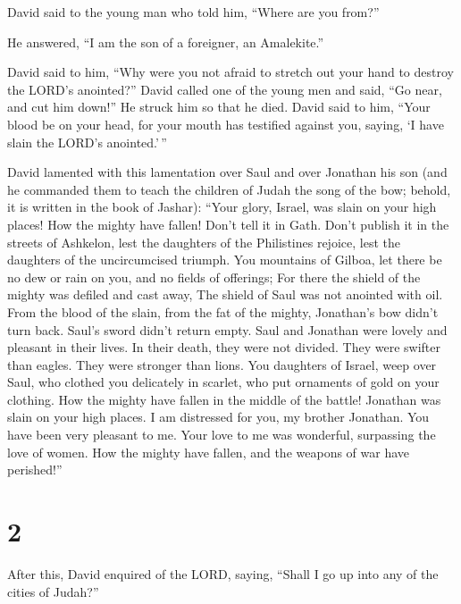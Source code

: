  David said to the young man who told him, ``Where are you
from?''

He answered, ``I am the son of a foreigner, an Amalekite.''

 David said to him, ``Why were you not afraid to stretch
out your hand to destroy the LORD's anointed?''  David
called one of the young men and said, ``Go near, and cut him down!'' He
struck him so that he died.  David said to him, ``Your
blood be on your head, for your mouth has testified against you, saying,
`I have slain the LORD's anointed.'\,''

 David lamented with this lamentation over Saul and over
Jonathan his son  (and he commanded them to teach the
children of Judah the song of the bow; behold, it is written in the book
of Jashar):  ``Your glory, Israel, was slain on your high
places! How the mighty have fallen!  Don't tell it in Gath.
Don't publish it in the streets of Ashkelon, lest the daughters of the
Philistines rejoice, lest the daughters of the uncircumcised triumph.
 You mountains of Gilboa, let there be no dew or rain on
you, and no fields of offerings; For there the shield of the mighty was
defiled and cast away, The shield of Saul was not anointed with oil.
 From the blood of the slain, from the fat of the mighty,
Jonathan's bow didn't turn back. Saul's sword didn't return empty.
 Saul and Jonathan were lovely and pleasant in their lives.
In their death, they were not divided. They were swifter than eagles.
They were stronger than lions.  You daughters of Israel,
weep over Saul, who clothed you delicately in scarlet, who put ornaments
of gold on your clothing.  How the mighty have fallen in
the middle of the battle! Jonathan was slain on your high places.
 I am distressed for you, my brother Jonathan. You have
been very pleasant to me. Your love to me was wonderful, surpassing the
love of women.  How the mighty have fallen, and the weapons
of war have perished!''

\hypertarget{section-1}{%
\section{2}\label{section-1}}

 After this, David enquired of the LORD, saying, ``Shall I
go up into any of the cities of Judah?''

